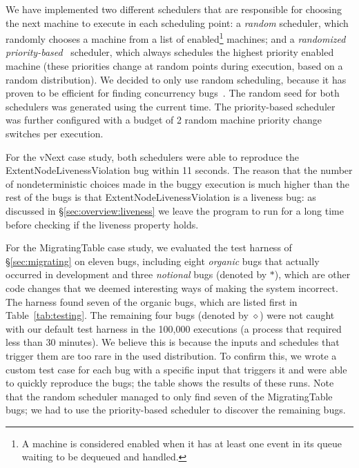 We have implemented two different schedulers that are responsible for choosing the next \psharp machine to execute in each scheduling point: a \emph{random} scheduler, which randomly chooses a machine from a list of enabled\footnote{A \psharp machine is considered enabled when it has at least one event in its queue waiting to be dequeued and handled.} machines; and a \emph{randomized priority-based}~\cite{burckhardt2010pct} scheduler, which always schedules the highest priority enabled machine (these priorities change at random points during execution, based on a random distribution). We decided to only use random scheduling, because it has proven to be efficient for finding concurrency bugs~\cite{thomson2014sct, deligiannis2015psharp}.
The random seed for both schedulers was generated using the current time. The priority-based scheduler was further configured with a budget of 2 random machine priority change switches per execution.

For the vNext case study, both schedulers were able to reproduce the ExtentNodeLivenessViolation bug within 11 seconds. The reason that the number of nondeterministic choices made in the buggy execution is much higher than the rest of the bugs is that ExtentNodeLivenessViolation is a liveness bug: as discussed in \S\ref{sec:overview:liveness} we leave the program to run for a long time before checking if the liveness property holds.

For the MigratingTable case study, we evaluated the \psharp test harness of \S\ref{sec:migrating} on eleven bugs, including eight \emph{organic} bugs that actually occurred in development and three \emph{notional} bugs (denoted by $*$), which are other code changes that we deemed interesting ways of making the system incorrect. The harness found seven of the organic bugs, which are listed first in Table~\ref{tab:testing}. The remaining four bugs (denoted by $\diamond$) were not caught with our default test harness in the 100,000 executions (a process that required less than 30 minutes). We believe this is because the inputs and schedules that trigger them are too rare in the used distribution. To confirm this, we wrote a custom test case for each bug with a specific input that triggers it and were able to quickly reproduce the bugs;
the table shows the results of these runs.
Note that the random scheduler managed to only find seven of the MigratingTable bugs; we had to use the priority-based scheduler to discover the remaining bugs.


